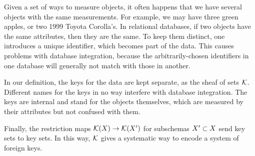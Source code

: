 \documentclass{amsart}
\begin{document}
\begin{remark}\label{rem:internal keys}

Given a set of ways to measure objects, it often happens that we have several objects with the same measurements.  For example, we may have three green apples, or two 1999 Toyota Corolla's.  In relational databases, if two objects have the same attributes, then they are the same.  To keep them distinct, one introduces a unique identifier, which becomes part of the data.  This causes problems with database integration, because the arbitrarily-chosen identifiers in one database will generally not match with those in another.

In our definition, the keys for the data are kept separate, as the sheaf of sets $\mcK$.  Different names for the keys in no way interfere with database integration.  The keys are internal and stand for the objects themselves, which are measured by their attributes but not confused with them.

Finally, the restriction maps $\mcK(X)\to\mcK(X')$ for subschemas $X'\ss X$ send key sets to key sets.  In this way, $\mcK$ gives a systematic way to encode a system of foreign keys.

\end{remark}
\end{document}
